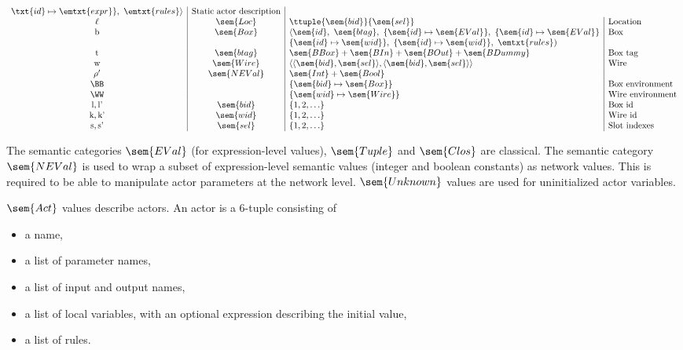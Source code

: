 \begin{equation*}
\begin{array}[t]{c|c|l|l}
    \txt{id} \mapsto \emtxt{expr}
    \rbrace, ~\emtxt{rules}\rangle & \text{Static actor description} \\
    \ell             & \sem{Loc} & \ttuple{\sem{bid}}{\sem{sel}} & \text{Location} \\
    \text{b}           & \sem{Box} & \langle \sem{id}, ~\sem{btag},~ \{\sem{id}\mapsto\sem{EVal}\},~ \{\sem{id}\mapsto\sem{EVal}\} & \text{Box} \\
    &           &         \{\sem{id}\mapsto\sem{wid}\},~\{\sem{id}\mapsto\sem{wid}\},~\emtxt{rules}) & \\
    \text{t}          & \sem{btag} & \sem{BBox} + \sem{BIn} + \sem{BOut} + \sem{BDummy} & \text{Box tag} \\
    \text{w}          & \sem{Wire} & \langle\langle\sem{bid},\sem{sel}\rangle,\langle\sem{bid},\sem{sel}\rangle\rangle & \text{Wire} \\
    \rho'             & \sem{NEVal}  & \sem{Int} + \sem{Bool} & \\
    \BB               &              & \lbrace \sem{bid} \mapsto \sem{Box} \rbrace & \text{Box environment} \\
    \WW               &              & \lbrace \sem{wid} \mapsto \sem{Wire} \rbrace & \text{Wire environment} \\
    \text{l},\text{l'} & \sem{bid} & \lbrace 1, 2, \ldots \rbrace & \text{Box id} \\
    \text{k},\text{k'} & \sem{wid} & \lbrace 1, 2, \ldots \rbrace & \text{Wire id} \\
    \text{s},\text{s'} & \sem{sel} & \lbrace 1, 2, \ldots \rbrace & \text{Slot indexes} \\
\end{array}
\end{equation*}

\medskip The semantic categories $\sem{EVal}$ (for expression-level values), $\sem{Tuple}$ and
$\sem{Clos}$ are classical. The semantic category $\sem{NEVal}$ is used to wrap a subset of
expression-level semantic values (integer and boolean constants) as network values. This is required
to be able to manipulate actor parameters at the network level.
$\sem{Unknown}$ values are used for uninitialized actor variables.

\medskip
$\sem{Act}$ values describe actors. An actor is a 6-tuple consisting of 
\begin{itemize}
\item a name,
\item a list of parameter names,
\item a list of input and output names,
\item a list of local variables, with an optional expression describing the initial value,
\item a list of rules.
\end{itemize}

